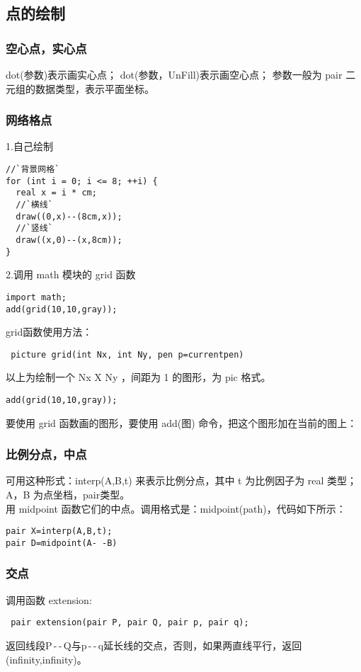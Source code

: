\subsection{点的绘制}
%
\subsubsection{空心点，实心点}
dot(参数)表示画实心点；
dot(参数，UnFill)表示画空心点；
参数一般为 pair 二元组的数据类型，表示平面坐标。\\



\subsubsection{网络格点}
1.自己绘制

\begin{lstlisting}
//`背景网格`
for (int i = 0; i <= 8; ++i) {
  real x = i * cm;
  //`横线`
  draw((0,x)--(8cm,x));
  //`竖线`
  draw((x,0)--(x,8cm));
}
\end{lstlisting}

2.调用 math 模块的 grid 函数\\
\begin{lstlisting}
import math;
add(grid(10,10,gray));
\end{lstlisting}
grid函数使用方法：\\
\begin{lstlisting}
 picture grid(int Nx, int Ny, pen p=currentpen)
\end{lstlisting}


以上为绘制一个 Nx X Ny ，间距为 1 的图形，为 pic 格式。\\
\begin{lstlisting}
add(grid(10,10,gray));
\end{lstlisting}

要使用 grid 函数画的图形，要使用 add(图) 命令，把这个图形加在当前的图上：



\subsubsection{比例分点，中点}
可用这种形式：\textcolor[rgb]{0.00,0.50,0.00}{interp(A,B,t)}
来表示比例分点，其中 t 为比例因子为 real 类型；A，B 为点坐档，pair类型。\\
用 midpoint 函数它们的中点。调用格式是：\textcolor[rgb]{1.00,0.00,0.00}{midpoint(path)}，代码如下所示：\\
\begin{lstlisting}
pair X=interp(A,B,t);
pair D=midpoint(A- -B)
\end{lstlisting}


\subsubsection{交点}
调用函数 extension:\\
\begin{lstlisting}
 pair extension(pair P, pair Q, pair p, pair q);
\end{lstlisting}
%
返回线段P\,-\,-\,Q与p\,-\,-\,q延长线的交点，否则，如果两直线平行，返回(infinity,infinity)。

\clearpage
